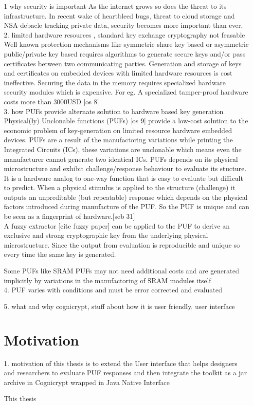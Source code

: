 1 why security is important
As the internet grows so does the threat to its infrastructure.
In recent wake of heartbleed bugs, threat to cloud storage and NSA debacle tracking private data, security becomes more important than ever.\\

2. limited hardware resources , standard key exchange cryptography not feasable
Well known protection mechanisms like symmetric share key based or asymmetric public/private key based requires algorithms to generate secure keys and/or pass certificates between two communicating parties. Generation and storage of keys and certificates on embedded devices with limited hardware resources is cost ineffective. Securing the data in the memory requires specialized hardware security modules which is expensive. For eg. A specialized tamper-proof hardware costs more than 3000USD [os 8]\\

3. how PUFs provide alternate solution to hardware based key generation
Physical(ly) Unclonable functions (PUFs) [os 9] provide a low-cost solution to the economic problem of key-generation on limited resource hardware embedded devices. PUFs are a result of the manufactoring variations while printing the Integrated Circuits (ICs), these variations are unclonable which means even the manufacturer cannot generate two identical ICs. PUFs depends on its physical microstructure and exhibit challenge/response behaviour to evaluate its stucture. It is a hardware analog to one-way function that is easy to evaluate but difficult to predict. When a physical stimulus is applied to the structure (challenge) it outputs an unpreditable (but repeatable) response which depends on the physical factors introduced during manufacture of the PUF. So the PUF is unique and can be seen as a fingerprint of hardware.[seb 31]\\

A fuzzy extractor [cite fuzzy paper] can be applied to the PUF to derive an exclusive and strong cryptographic key from the underlying physical microstructure. Since the output from evaluation is reproducible and unique so every time the same key is generated.

Some PUFs like SRAM PUFs may not need additional costs and are generated implicitly by variations in the manufactoring of SRAM modules itself\\

4. PUF varies with conditions and must be error corrected and evaluated

5. what and why cognicrypt, stuff about how it is user friendly, user interface\\

\section{Motivation}
1. motivation of this thesis is to extend the User interface that helps designers and researchers to evaluate PUF responses
 and then integrate the toolkit as a jar archive in Cognicrypt wrapped in Java Native Interface 

 This thesis 
